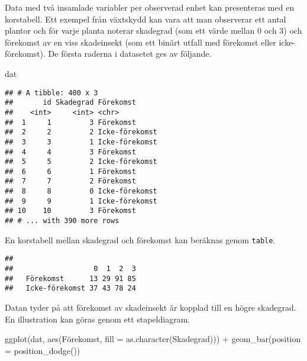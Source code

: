 \documentclass[
]{book}
\newenvironment{Shaded}{\begin{snugshade}}{\end{snugshade}}
\newcommand{\AttributeTok}[1]{\textcolor[rgb]{0.77,0.63,0.00}{#1}}
\newcommand{\FunctionTok}[1]{\textcolor[rgb]{0.00,0.00,0.00}{#1}}
\newcommand{\NormalTok}[1]{#1}
\newcommand{\SpecialCharTok}[1]{\textcolor[rgb]{0.00,0.00,0.00}{#1}}
\theoremstyle{definition}
\theoremstyle{definition}
\theoremstyle{definition}
\theoremstyle{definition}
\theoremstyle{remark}
\begin{document}
Data med två insamlade variabler per observerad enhet kan presenteras med en korstabell. Ett exempel från växtskydd kan vara att man observerar ett antal plantor och för varje planta noterar skadegrad (som ett värde mellan 0 och 3) och förekomst av en viss skadeinsekt (som ett binärt utfall med förekomst eller icke-förekomst). De första raderna i datasetet ges av följande.

\begin{Shaded}
\begin{Highlighting}[]
\NormalTok{dat}
\end{Highlighting}
\end{Shaded}

\begin{verbatim}
## # A tibble: 400 x 3
##       id Skadegrad Förekomst     
##    <int>     <int> <chr>         
##  1     1         3 Förekomst     
##  2     2         2 Icke-förekomst
##  3     3         1 Icke-förekomst
##  4     4         3 Förekomst     
##  5     5         2 Icke-förekomst
##  6     6         1 Förekomst     
##  7     7         2 Förekomst     
##  8     8         0 Icke-förekomst
##  9     9         1 Icke-förekomst
## 10    10         3 Förekomst     
## # ... with 390 more rows
\end{verbatim}

En korstabell mellan skadegrad och förekomst kan beräknas genom \texttt{table}.

\begin{Shaded}
\end{Shaded}

\begin{verbatim}
##                 
##                   0  1  2  3
##   Förekomst      13 29 91 85
##   Icke-förekomst 37 43 78 24
\end{verbatim}

Datan tyder på att förekomst av skadeinsekt är kopplad till en högre skadegrad. En illustration kan göras genom ett stapeldiagram.

\begin{Shaded}
\begin{Highlighting}[]
\FunctionTok{ggplot}\NormalTok{(dat, }\FunctionTok{aes}\NormalTok{(Förekomst, }\AttributeTok{fill =} \FunctionTok{as.character}\NormalTok{(Skadegrad))) }\SpecialCharTok{+}
  \FunctionTok{geom\_bar}\NormalTok{(}\AttributeTok{position =} \FunctionTok{position\_dodge}\NormalTok{())}
\end{Highlighting}
\end{Shaded}
\end{document}
